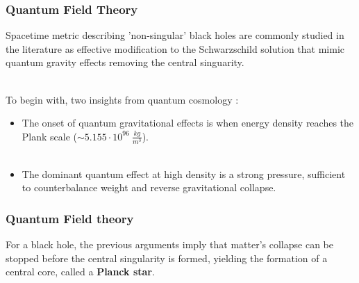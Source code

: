 \documentclass{beamer}
\begin{document}
\begin{frame}
\frametitle{Quantum Field Theory}
Spacetime metric describing 'non-singular' black holes are commonly studied in the literature \cite{effective,planck stars} as effective modification to the Schwarzschild solution that mimic quantum gravity effects removing the central singuarity.\\\

To begin with, two insights from quantum cosmology \cite{ashtekar}:

\begin{itemize}
\item The onset of quantum gravitational effects is when energy density reaches the Plank scale ($\sim 5.155 \cdot 10^{96}\ \frac{kg}{m^3}$).\\\

\item The dominant quantum effect at high density is a strong pressure, sufficient to counterbalance weight and reverse gravitational collapse.
\end{itemize} 
\end{frame}

%
%
%

\begin{frame}
\frametitle{Quantum Field theory}

For a black hole, the previous arguments imply that matter's collapse can be stopped before the central singularity is formed, yielding the formation of a central core, called a \textbf{Planck star}.

\end{frame}
\end{document}
